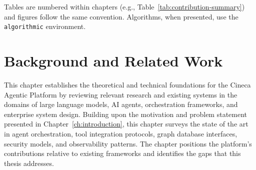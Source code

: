 \documentclass[a4paper,twoside]{sapthesis}
\begin{document}
Tables are numbered within chapters (e.g., Table~\ref{tab:contribution-summary}) and figures follow the same convention. Algorithms, when presented, use the \texttt{algorithmic} environment.


\chapter{Background and Related Work}
\label{ch:background}

%

This chapter establishes the theoretical and technical foundations for the Cineca Agentic Platform by reviewing relevant research and existing systems in the domains of large language models, AI agents, orchestration frameworks, and enterprise system design. Building upon the motivation and problem statement presented in Chapter~\ref{ch:introduction}, this chapter surveys the state of the art in agent orchestration, tool integration protocols, graph database interfaces, security models, and observability patterns. The chapter positions the platform's contributions relative to existing frameworks and identifies the gaps that this thesis addresses.
\end{document}
